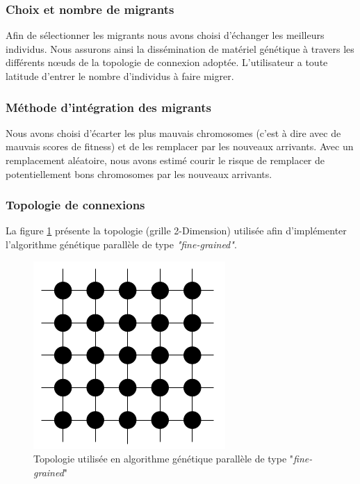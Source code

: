 	\subsubsection{Choix et nombre de migrants}
	 Afin de sélectionner les migrants nous avons choisi d'échanger les meilleurs individus. Nous assurons ainsi la dissémination de matériel génétique à travers les différents nœuds de la topologie de connexion adoptée. L'utilisateur a toute latitude d'entrer le nombre d'individus à faire migrer.
	
	\subsubsection{Méthode d'intégration des migrants}
 	
 	Nous avons choisi d'écarter les plus mauvais chromosomes (c'est à dire avec de mauvais scores de fitness) et de les remplacer par les nouveaux arrivants. Avec un remplacement aléatoire, nous avons estimé courir le risque de remplacer de potentiellement bons chromosomes par les nouveaux arrivants.
	
	\subsubsection{Topologie de connexions}
	
	La figure \ref{fig:fine_grained_fig} présente la topologie (grille 2-Dimension) utilisée afin d'implémenter l'algorithme génétique parallèle de type \emph{"fine-grained"}.
	
	\begin{figure}[!h]
		\begin{center}
			\includegraphics[scale=.3]{images/fine_grained_fig.png}
			\caption{Topologie utilisée en algorithme génétique parallèle de type "\emph{fine-grained}" \cite{cant2}}
			\label{fig:fine_grained_fig}
		\end{center}
	\end{figure} 
	
